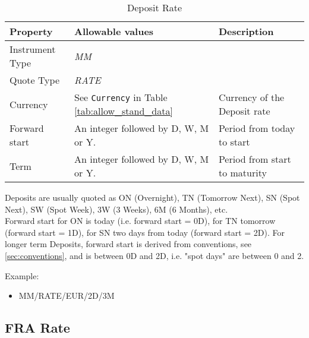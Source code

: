 \begin{table}[H]
\centering
  \begin{tabular}{|p{3cm}|p{3.5cm}|p{7cm}|}
  \hline
    {\bf Property} & {\bf Allowable values} & {\bf Description} \\ \hline
    Instrument Type & \emph{MM} & \\ \hline
    Quote Type & \emph{RATE} & \\ \hline
    Currency & See \lstinline!Currency! in Table \ref{tab:allow_stand_data} & Currency of the Deposit rate\\ \hline
    Forward start & An integer followed by D, W, M or Y.  & Period from today to start \\ \hline
    Term & An integer followed by D, W, M or Y. & Period from start to maturity\\ \hline
  \end{tabular}
  \caption{Deposit Rate}
  \label{tab:deposit_quote}
\end{table}


Deposits are usually quoted as ON (Overnight), TN (Tomorrow Next), SN
(Spot Next), SW (Spot Week), 3W (3 Weeks), 6M (6 Months), etc. \\

Forward start for ON is today (i.e. forward start = 0D), for TN tomorrow (forward start = 1D), for SN two days from
today (forward start = 2D). For longer term Deposits, forward start is derived from conventions, see 
\ref{sec:conventions}, and is between 0D and 2D, i.e. "spot days" are between 0 and 2.

\medskip
Example:
\begin{itemize}
\item {MM/RATE/EUR/2D/3M}
\end{itemize}

\subsection{FRA Rate}

